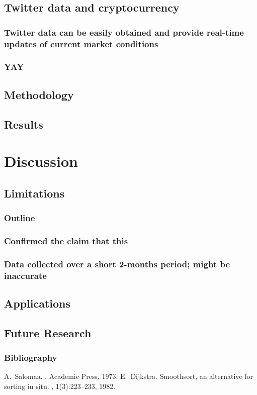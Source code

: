 \documentclass{beamer}
\begin{document}
\subsection{Twitter data and cryptocurrency}
\begin{frame}
	\frametitle{Twitter data can be easily obtained and provide real-time updates of current market conditions}
\end{frame}
\begin{frame}
	\frametitle{YAY}
\end{frame}
\subsection{Methodology}
\subsection{Results}

\section{Discussion}
\subsection{Limitations}
\begin{frame}
	\frametitle{Outline}
	\tableofcontents[hideothersubsections]
\end{frame}
\begin{frame}
	\frametitle{Confirmed the claim that this}
\end{frame}
\begin{frame}
	\frametitle{Data collected over a short 2-months period; might be inaccurate}
\end{frame}
\subsection{Applications}
\subsection{Future Research}
\begin{frame}[plain]
	\frametitle{Bibliography}
	\begin{thebibliography}{Dijkstra, 1982}
		A.~Salomaa.
		.
		\newblock Academic Press, 1973.
		E.~Dijkstra.
		\newblock Smoothsort, an alternative for sorting in situ.
		, 1(3):223--233, 1982.
	\end{thebibliography}
\end{frame}
\end{document}
